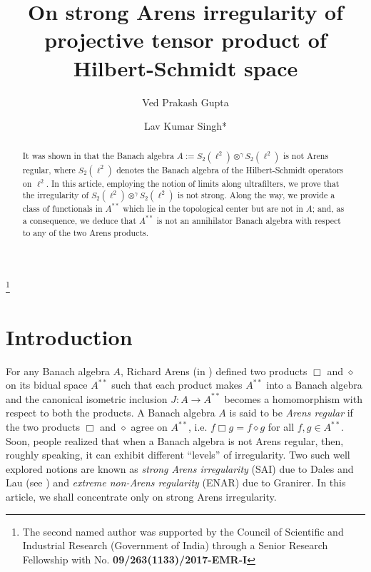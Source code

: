 \documentclass[a4]{amsart}
\theoremstyle{cupthm}
\theoremstyle{cupdefn}
\theoremstyle{cuprem}
\numberwithin{equation}{section}
\newcommand{\obp}{\otimes^{\gamma}}
\begin{document}
\title[On SAI of projective tensor product of Hilbert-Schmidt
  space]{On strong Arens irregularity of projective tensor product of
  Hilbert-Schmidt space}


\author[V P Gupta]{Ved Prakash Gupta}

\author[L K Singh]{Lav Kumar Singh*}

\address{School of Physical Sciences, Jawaharlal Nehru University, New Delhi}




\date{}


\thanks{The second named author was  supported
  by the Council of Scientific and Industrial Research (Government
  of India) through a Senior Research Fellowship with
  No. \bf 09/263(1133)/2017-EMR-I}

\begin{abstract}
It was shown in \cite{Lav} that the Banach algebra $A:=S_2(\ell^2)\obp
S_2(\ell^2)$ is not Arens regular, where $S_2(\ell^2)$ denotes the
Banach algebra of the Hilbert-Schmidt operators on $\ell^2$. In this
article, employing the notion of limits along ultrafilters, we prove
that the irregularity of $S_2(\ell^2)\obp S_2(\ell^2)$ is not
strong. Along the way, we provide a class of functionals in $A^{**}$
which lie in the topological center but are not in $A$; and, as a
consequence, we deduce that $A^{**}$ is not an annihilator Banach
algebra with respect to any of the two Arens products.
\end{abstract}

\maketitle

\section{Introduction}
 For any Banach algebra $A$, Richard Arens (in \cite{Arens}) defined
two products $\Box$ and $\diamond$ on its bidual space $A^{**}$ such
that each product makes $A^{**}$ into a Banach algebra and the
canonical isometric inclusion $J:A\to A^{**}$ becomes a homomorphism
with respect to both the products. A Banach algebra $A$ is said to be
\textit{Arens regular} if the two products $\Box$ and $\diamond$ agree
on $A^{**}$, i.e. $f\Box g=f\diamond g$ for all $f,g\in A^{**}$. Soon,
people realized that when a Banach algebra is not Arens regular, then,
roughly speaking, it can exhibit different ``levels'' of
irregularity. Two such well explored notions are known as {\em strong
  Arens irregularity} (SAI) due to Dales and Lau (see \cite[Definition
  2.18]{DL}) and {\em extreme non-Arens regularity } (ENAR) due to
Granirer. In this article, we shall concentrate only on strong Arens
irregularity.
\end{document}
